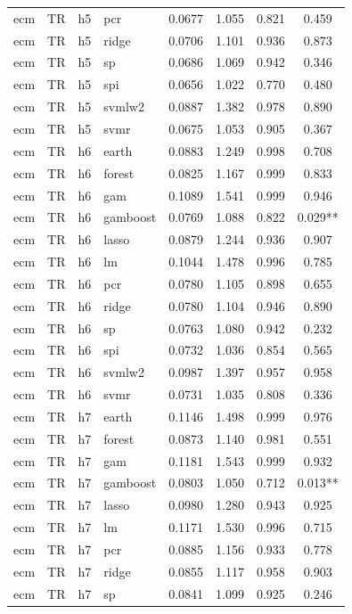 \begin{ThreePartTable}
\begin{longtable}[t]{llclcccc}
ecm & TR & h5 & pcr & 0.0677 & 1.055 & 0.821 & 0.459\\
ecm & TR & h5 & ridge & 0.0706 & 1.101 & 0.936 & 0.873\\
ecm & TR & h5 & sp & 0.0686 & 1.069 & 0.942 & 0.346\\
ecm & TR & h5 & spi & 0.0656 & 1.022 & 0.770 & 0.480\\
ecm & TR & h5 & svmlw2 & 0.0887 & 1.382 & 0.978 & 0.890\\
ecm & TR & h5 & svmr & 0.0675 & 1.053 & 0.905 & 0.367\\
\addlinespace
ecm & TR & h6 & earth & 0.0883 & 1.249 & 0.998 & 0.708\\
ecm & TR & h6 & forest & 0.0825 & 1.167 & 0.999 & 0.833\\
ecm & TR & h6 & gam & 0.1089 & 1.541 & 0.999 & 0.946\\
ecm & TR & h6 & gamboost & 0.0769 & 1.088 & 0.822 & 0.029**\\
ecm & TR & h6 & lasso & 0.0879 & 1.244 & 0.936 & 0.907\\
ecm & TR & h6 & lm & 0.1044 & 1.478 & 0.996 & 0.785\\
ecm & TR & h6 & pcr & 0.0780 & 1.105 & 0.898 & 0.655\\
ecm & TR & h6 & ridge & 0.0780 & 1.104 & 0.946 & 0.890\\
ecm & TR & h6 & sp & 0.0763 & 1.080 & 0.942 & 0.232\\
ecm & TR & h6 & spi & 0.0732 & 1.036 & 0.854 & 0.565\\
ecm & TR & h6 & svmlw2 & 0.0987 & 1.397 & 0.957 & 0.958\\
ecm & TR & h6 & svmr & 0.0731 & 1.035 & 0.808 & 0.336\\
\addlinespace
ecm & TR & h7 & earth & 0.1146 & 1.498 & 0.999 & 0.976\\
ecm & TR & h7 & forest & 0.0873 & 1.140 & 0.981 & 0.551\\
ecm & TR & h7 & gam & 0.1181 & 1.543 & 0.999 & 0.932\\
ecm & TR & h7 & gamboost & 0.0803 & 1.050 & 0.712 & 0.013**\\
ecm & TR & h7 & lasso & 0.0980 & 1.280 & 0.943 & 0.925\\
ecm & TR & h7 & lm & 0.1171 & 1.530 & 0.996 & 0.715\\
ecm & TR & h7 & pcr & 0.0885 & 1.156 & 0.933 & 0.778\\
ecm & TR & h7 & ridge & 0.0855 & 1.117 & 0.958 & 0.903\\
ecm & TR & h7 & sp & 0.0841 & 1.099 & 0.925 & 0.246\\

\end{longtable}
\end{ThreePartTable}
